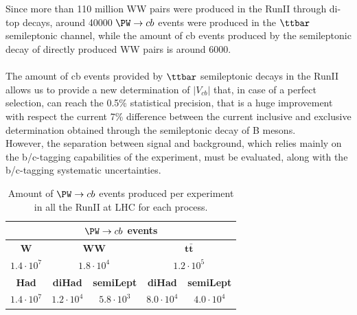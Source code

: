 \\
\\
Since more than 110 million WW pairs were produced in the RunII through di-top decays, around 40000 $\PW \to cb$ events were produced in the $\ttbar$ semileptonic channel, while the amount of cb events produced by the semileptonic decay of directly produced WW pairs is around 6000.\\
\\
The amount of cb events provided by $\ttbar$ semileptonic decays in the RunII allows us to provide a new determination of $|V_{cb}|$ that, in case of a perfect selection, can reach the 0.5\% statistical precision, that is a huge improvement with respect the current 7\% difference between the current inclusive and exclusive determination obtained through the semileptonic decay of B mesons.\\
However, the separation between signal and background, which relies mainly on the b/c-tagging capabilities of the experiment, must be evaluated, along with the b/c-tagging systematic uncertainties.

\begin{table}[H]
    \centering
    \begin{tabular}{c|c|c|c|c}
        \toprule
        \multicolumn{5}{c}{$\PW \to cb$ events}\\
        \midrule
        \midrule
        \textbf{W} &  \multicolumn{2}{c|}{\textbf{WW}} & \multicolumn{2}{c}{$\bm{t\bar{t}}$} \\
        \midrule
          $1.4 \cdot 10^7$&  \multicolumn{2}{c|}{$1.8 \cdot 10^4$}  &  \multicolumn{2}{c}{$1.2 \cdot 10^5$} \\
        \midrule
        \textbf{Had} & \textbf{diHad} & \textbf{semiLept} & \textbf{diHad} & \textbf{semiLept}\\
        \midrule
         $1.4 \cdot 10^7$ & $1.2\cdot 10^4$ & $5.8 \cdot 10^3$ & $8.0 \cdot 10^4$ & $4.0\cdot 10^4$ \\
         \bottomrule

    \end{tabular}
    \caption{Amount of $\PW \to cb$ events produced per experiment in all the RunII at LHC for each process.}
    \label{tab:my_label}
\end{table}